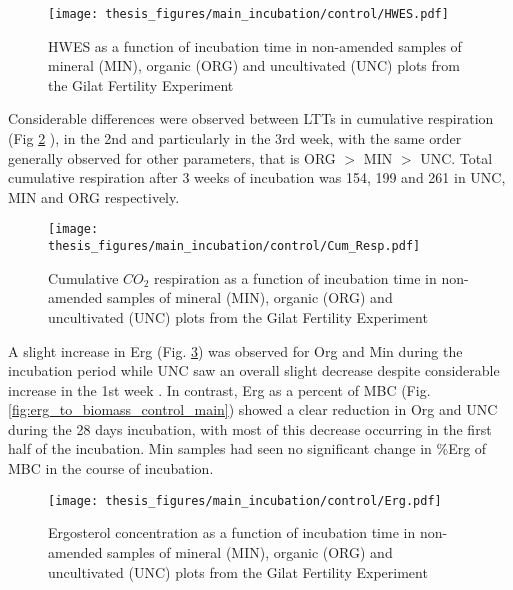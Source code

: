 \documentclass[12pt]{report}
\begin{document}
		\begin{figure}[H]
			\centering
			\texttt{[image: thesis\_figures/main\_incubation/control/HWES.pdf]}
			\caption{HWES as a function of incubation time in non-amended samples of mineral (MIN), organic (ORG) and uncultivated (UNC) plots from the Gilat Fertility Experiment}
			\label{fig:hwes_control_main}
		\end{figure}
		
		\noindent Considerable differences were observed between LTTs in cumulative respiration (Fig \ref{fig:cumulative_control_main} ), in the 2nd and particularly in the 3rd week, with the same order generally observed for other parameters, that is ORG $ > $ MIN $ > $ UNC. Total cumulative respiration after 3 weeks of incubation was 154, 199 and 261 in UNC, MIN and ORG respectively.
		\begin{figure}[H]
			\centering
			\texttt{[image: thesis\_figures/main\_incubation/control/Cum\_Resp.pdf]}
			\caption{Cumulative $CO_2$ respiration  as a function of incubation time in non-amended samples of mineral (MIN), organic (ORG) and uncultivated (UNC) plots from the Gilat Fertility Experiment}
			\label{fig:cumulative_control_main}
		\end{figure}
		\noindent A slight increase in Erg (Fig. \ref{fig:erg_control_main}) was observed for Org and Min during the incubation period while UNC saw an overall slight decrease despite considerable increase in the 1st week . In contrast, Erg as a percent of MBC (Fig. \ref{fig:erg_to_biomass_control_main}) showed a clear reduction in Org and UNC during the 28 days incubation, with most of this decrease occurring in the first half of the incubation. Min samples had seen no significant change in \%Erg of MBC in the course of incubation.
		\begin{figure}[H]
			\centering
			\texttt{[image: thesis\_figures/main\_incubation/control/Erg.pdf]}
			\caption{Ergosterol concentration  as a function of incubation time in non-amended samples of mineral (MIN), organic (ORG) and uncultivated (UNC) plots from the Gilat Fertility Experiment}
			\label{fig:erg_control_main}
		\end{figure}
		
\end{document}
